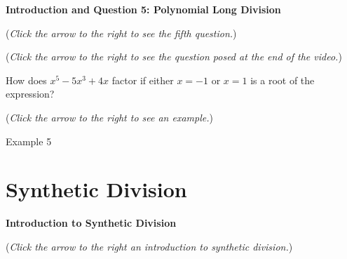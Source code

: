 \documentclass{ximera}
\begin{document}
\textbf{Introduction and Question 5: Polynomial Long Division}
\begin{question}
\begin{flushright}
{\color{blue}(\emph{Click the arrow to the right to see the fifth question.})}
\end{flushright}
\begin{center}
\begin{expandable}
\begin{flushright}
{\color{blue}(\emph{Click the arrow to the right to see the  question
posed at the end of the video.})}
\end{flushright}
\begin{expandable}
How does $x^5 - 5x^3 + 4x$ factor if either $x=-1$ or $x=1$ is a root of the expression?
\begin{multipleChoice}
\end{multipleChoice}
\begin{flushright}
{\color{blue}(\emph{Click the arrow to the right to see an example.})}
\end{flushright}
\begin{expandable}
\begin{center}
Example 5
\end{center}
\end{expandable}
\end{expandable}
\end{expandable}
\end{center}
\end{question}


\section{Synthetic Division}

\textbf{Introduction to Synthetic Division}
\begin{explanation}
\begin{flushright}
{\color{blue}(\emph{Click the arrow to the right an introduction to 
synthetic division.})}
\end{flushright}
\begin{expandable}
\end{expandable}
\end{explanation}
\end{document}
